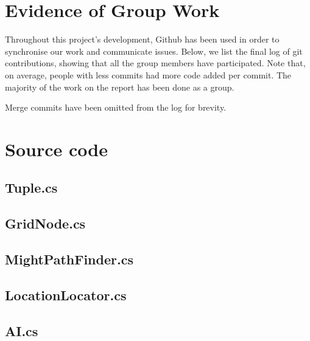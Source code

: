 \documentclass[11pt]{article}
\begin{document}
\newpage
\appendix

\section{Evidence of Group Work}
Throughout this project's development, Github has been used in order to synchronise our work and communicate issues. Below, we list the final log of git contributions, showing that all the group members have participated. Note that, on average, people with less commits had more code added per commit. The majority of the work on the report has been done as a group.

Merge commits have been omitted from the log for brevity.

\section{Source code}

\subsection*{Tuple.cs}
\begin{code}
  
\end{code}
\subsection*{GridNode.cs}
\begin{code}
  
\end{code}
\subsection*{MightPathFinder.cs}
\begin{code}
  
\end{code}
\subsection*{LocationLocator.cs}
\begin{code}
  
\end{code}
\subsection*{AI.cs}
\begin{code}

\end{code}
\end{document}
